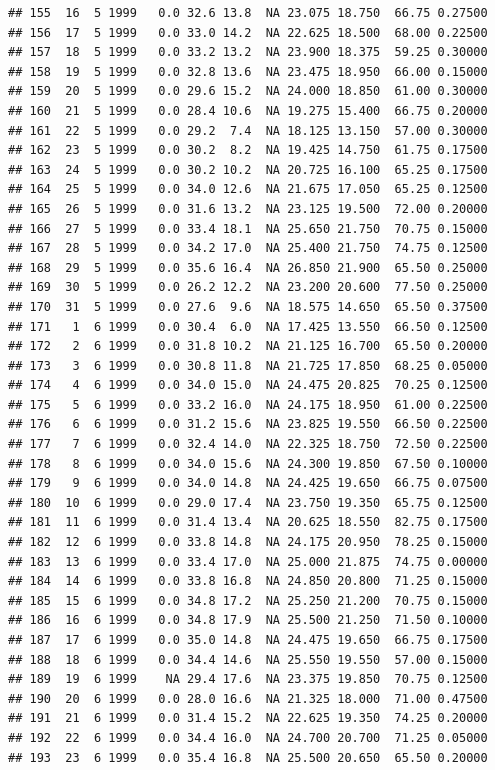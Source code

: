 \documentclass[
]{book}
\begin{document}
\begin{verbatim}
## 155  16  5 1999   0.0 32.6 13.8  NA 23.075 18.750  66.75 0.27500
## 156  17  5 1999   0.0 33.0 14.2  NA 22.625 18.500  68.00 0.22500
## 157  18  5 1999   0.0 33.2 13.2  NA 23.900 18.375  59.25 0.30000
## 158  19  5 1999   0.0 32.8 13.6  NA 23.475 18.950  66.00 0.15000
## 159  20  5 1999   0.0 29.6 15.2  NA 24.000 18.850  61.00 0.30000
## 160  21  5 1999   0.0 28.4 10.6  NA 19.275 15.400  66.75 0.20000
## 161  22  5 1999   0.0 29.2  7.4  NA 18.125 13.150  57.00 0.30000
## 162  23  5 1999   0.0 30.2  8.2  NA 19.425 14.750  61.75 0.17500
## 163  24  5 1999   0.0 30.2 10.2  NA 20.725 16.100  65.25 0.17500
## 164  25  5 1999   0.0 34.0 12.6  NA 21.675 17.050  65.25 0.12500
## 165  26  5 1999   0.0 31.6 13.2  NA 23.125 19.500  72.00 0.20000
## 166  27  5 1999   0.0 33.4 18.1  NA 25.650 21.750  70.75 0.15000
## 167  28  5 1999   0.0 34.2 17.0  NA 25.400 21.750  74.75 0.12500
## 168  29  5 1999   0.0 35.6 16.4  NA 26.850 21.900  65.50 0.25000
## 169  30  5 1999   0.0 26.2 12.2  NA 23.200 20.600  77.50 0.25000
## 170  31  5 1999   0.0 27.6  9.6  NA 18.575 14.650  65.50 0.37500
## 171   1  6 1999   0.0 30.4  6.0  NA 17.425 13.550  66.50 0.12500
## 172   2  6 1999   0.0 31.8 10.2  NA 21.125 16.700  65.50 0.20000
## 173   3  6 1999   0.0 30.8 11.8  NA 21.725 17.850  68.25 0.05000
## 174   4  6 1999   0.0 34.0 15.0  NA 24.475 20.825  70.25 0.12500
## 175   5  6 1999   0.0 33.2 16.0  NA 24.175 18.950  61.00 0.22500
## 176   6  6 1999   0.0 31.2 15.6  NA 23.825 19.550  66.50 0.22500
## 177   7  6 1999   0.0 32.4 14.0  NA 22.325 18.750  72.50 0.22500
## 178   8  6 1999   0.0 34.0 15.6  NA 24.300 19.850  67.50 0.10000
## 179   9  6 1999   0.0 34.0 14.8  NA 24.425 19.650  66.75 0.07500
## 180  10  6 1999   0.0 29.0 17.4  NA 23.750 19.350  65.75 0.12500
## 181  11  6 1999   0.0 31.4 13.4  NA 20.625 18.550  82.75 0.17500
## 182  12  6 1999   0.0 33.8 14.8  NA 24.175 20.950  78.25 0.15000
## 183  13  6 1999   0.0 33.4 17.0  NA 25.000 21.875  74.75 0.00000
## 184  14  6 1999   0.0 33.8 16.8  NA 24.850 20.800  71.25 0.15000
## 185  15  6 1999   0.0 34.8 17.2  NA 25.250 21.200  70.75 0.15000
## 186  16  6 1999   0.0 34.8 17.9  NA 25.500 21.250  71.50 0.10000
## 187  17  6 1999   0.0 35.0 14.8  NA 24.475 19.650  66.75 0.17500
## 188  18  6 1999   0.0 34.4 14.6  NA 25.550 19.550  57.00 0.15000
## 189  19  6 1999    NA 29.4 17.6  NA 23.375 19.850  70.75 0.12500
## 190  20  6 1999   0.0 28.0 16.6  NA 21.325 18.000  71.00 0.47500
## 191  21  6 1999   0.0 31.4 15.2  NA 22.625 19.350  74.25 0.20000
## 192  22  6 1999   0.0 34.4 16.0  NA 24.700 20.700  71.25 0.05000
## 193  23  6 1999   0.0 35.4 16.8  NA 25.500 20.650  65.50 0.20000

\end{verbatim}
\end{document}
